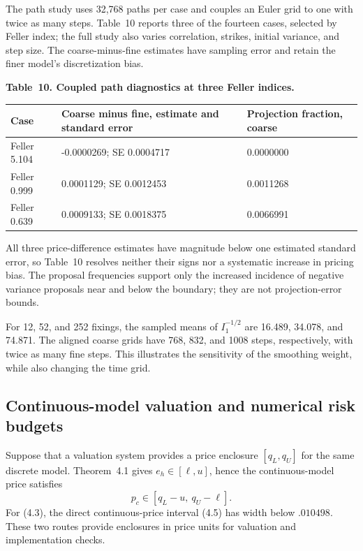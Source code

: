 The path study uses 32,768 paths per case and couples an Euler grid to one
with twice as many steps. Table~10 reports three of the fourteen cases, selected
by Feller index; the full study also varies correlation, strikes, initial
variance, and step size. The coarse-minus-fine estimates have sampling error
and retain the finer model's discretization bias.

\noindent\textbf{Table~10. Coupled path diagnostics at three Feller indices.}
\begin{center}
\begin{tabularx}{\textwidth}{@{}l X X@{}}
\toprule
Case & Coarse minus fine, estimate and standard error & Projection fraction, coarse \\
\midrule
Feller 5.104 & -0.0000269; SE 0.0004717 & 0.0000000 \\
Feller 0.999 & 0.0001129; SE 0.0012453 & 0.0011268 \\
Feller 0.639 & 0.0009133; SE 0.0018375 & 0.0066991 \\
\bottomrule
\end{tabularx}
\end{center}

All three price-difference estimates have magnitude below one estimated
standard error, so Table~10 resolves neither their signs nor a systematic
increase in pricing bias. The proposal frequencies support only the increased
incidence of negative variance proposals near and below the boundary; they
are not projection-error bounds.

For 12, 52, and 252 fixings, the sampled means of \(I_1^{-1/2}\) are 16.489,
34.078, and 74.871. The aligned coarse grids have 768, 832, and 1008 steps,
respectively, with twice as many fine steps. This illustrates the sensitivity
of the smoothing weight, while also changing the time grid.

\subsection{Continuous-model valuation and numerical risk budgets}

Suppose that a valuation system provides a price enclosure \([q_L,q_U]\) for the same
discrete model. Theorem~4.1 gives \(e_h\in[\ell,u]\), hence the continuous-model price satisfies
\[
p_c\in[q_L-u,\ q_U-\ell].
\tag{8.1}
\]
For (4.3), the direct continuous-price interval (4.5) has width below
\(.010498\). These two routes provide enclosures in price units for valuation
and implementation checks.

